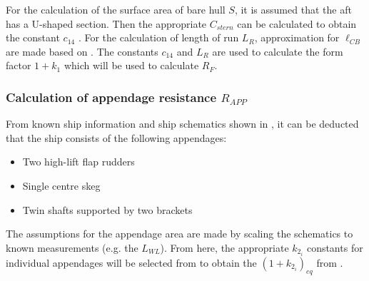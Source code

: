 For the calculation of the surface area of bare hull $S$, it is assumed that the aft has a U-shaped section. Then the appropriate $C_{stern}$ can be calculated to obtain the constant $c_{14}$ . For the calculation of length of run $L_R$, approximation for $\ell_{CB}$ are made based on . The constants $c_{14}$ and $L_R$ are used to calculate the form factor $1+k_1$ which will be used to calculate $R_F$.

\subsubsection*{Calculation of appendage resistance $R_{APP}$}

From known ship information and ship schematics shown in , it can be deducted that the ship consists of the following appendages:

\begin{itemize}
    \setlength\itemsep{0em}
    \item Two high-lift flap rudders
    \item Single centre skeg
    \item Twin shafts supported by two brackets
\end{itemize}

The assumptions for the appendage area are made by scaling the schematics to known measurements (e.g. the $L_{WL}$). From here, the appropriate $k_{2_i}$ constants for individual appendages will be selected from  to obtain the $(1+k_{2_i})_{eq}$ from .

